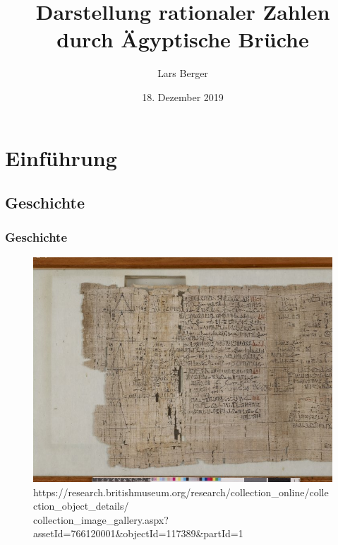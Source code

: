 \documentclass{beamer}
\title[Ägyptische Brüche]{Darstellung rationaler Zahlen durch Ägyptische Brüche} %
\author{Lars Berger} %
\institute[UniBwM]{Universität der Bundeswehr München}
\date{18. Dezember 2019} %
\begin{document}
\newcommand{\R}{\mathds{R}}
\newcommand{\Z}{\mathds{Z}}
\newcommand{\N}{\mathds{N}}
\newcommand{\Q}{\mathds{Q}}
\newcommand{\K}{\mathds{K}}
\newcommand{\C}{\mathds{C}}
\newcommand{\B}{\mathds{B}}
\newcommand{\F}{\mathds{F}}
\newcommand{\p}{\mathfrak{p}}
\newcommand{\Pot}{\mathcal{P}}
\newcommand{\id}{\textup{id}}
\newcommand{\Ker}{\textup{Ker}}
\newcommand{\Image}{\textup{Im}}
\newcommand{\la}{\langle}
\newcommand{\ra}{\rangle}
\newcommand{\gdw}{\Leftrightarrow}
\newcommand{\uf}[1]{\frac{1}{#1}}

\begin{frame}
\titlepage %
\end{frame}


\section{Einführung}
\subsection{Geschichte}

\begin{frame}
	\frametitle{Geschichte}
	\begin{figure}
	\includegraphics[width=.9\textwidth]{images/Rhind.jpg}
	\tiny{https://research.britishmuseum.org/research/collection\_online/collection\_object\_details/\\collection\_image\_gallery.aspx?assetId=766120001\&objectId=117389\&partId=1}
	\end{figure}
\end{frame}
\end{document}
